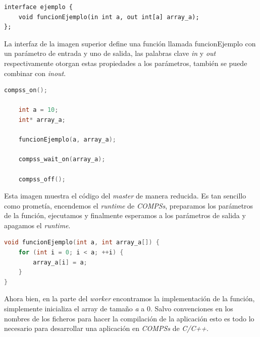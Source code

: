 \documentclass[a4paper]{article}
\begin{document}
\begin{lstlisting}[caption={Interfaz de la aplicación 'ejemplo'.},captionpos=b, label={lst:ejemplo.idl}, style=idlstyle]
interface ejemplo {
    void funcionEjemplo(in int a, out int[a] array_a);
};
\end{lstlisting}

La interfaz de la imagen superior define una función llamada funcionEjemplo con un parámetro de entrada y uno de salida, las palabras clave \textit{in} y \textit{out} respectivamente otorgan estas propiedades a los parámetros, también se puede combinar con \textit{inout}. \smallskip

\begin{lstlisting}[caption={Fracción del código del \textit{master}}, captionpos=b, label={lst:ejemplo.cc}, language=C++]
    compss_on();

    int a = 10;
    int* array_a;

    funcionEjemplo(a, array_a);

    compss_wait_on(array_a);

    compss_off();
\end{lstlisting}

Esta imagen muestra el código del \textit{master} de manera reducida. Es tan sencillo como prometía, encendemos el \textit{runtime} de \textit{COMPSs}, preparamos los parámetros de la función, ejecutamos y finalmente esperamos a los parámetros de salida y apagamos el \textit{runtime}. \smallskip

\begin{lstlisting}[caption={Implementación de la función 'funcionEjemplo'}, captionpos=b, label={lst:ejemplo-functions.cc}, language=C++]
void funcionEjemplo(int a, int array_a[]) {
    for (int i = 0; i < a; ++i) {
        array_a[i] = a;
    }
}
\end{lstlisting}

Ahora bien, en la parte del \textit{worker} encontramos la implementación de la función, simplemente inicializa el array de tamaño \textit{a} a 0. Salvo convenciones en los nombres de los ficheros para hacer la compilación de la aplicación esto es todo lo necesario para desarrollar una aplicación en \textit{COMPSs} de \textit{C/C++}.
\end{document}
